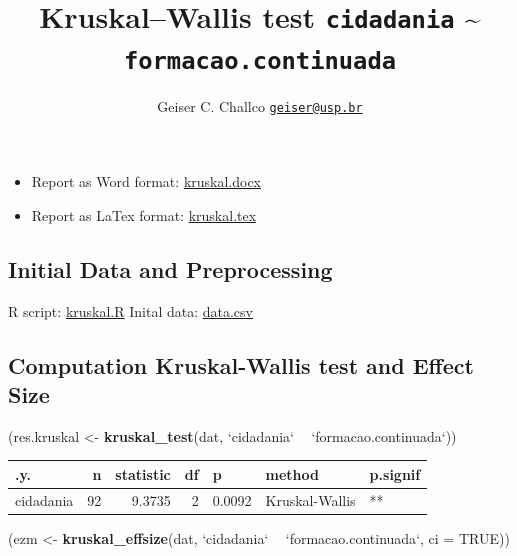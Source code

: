 \documentclass[]{article}
\title{Kruskal--Wallis test \texttt{cidadania} \textasciitilde{}
\texttt{formacao.continuada}}
\author{Geiser C. Challco \href{mailto:geiser@usp.br}{\nolinkurl{geiser@usp.br}}}
\date{}
\newenvironment{Shaded}{\begin{snugshade}}{\end{snugshade}}
\newcommand{\DataTypeTok}[1]{\textcolor[rgb]{0.13,0.29,0.53}{#1}}
\newcommand{\KeywordTok}[1]{\textcolor[rgb]{0.13,0.29,0.53}{\textbf{#1}}}
\newcommand{\NormalTok}[1]{#1}
\newcommand{\OperatorTok}[1]{\textcolor[rgb]{0.81,0.36,0.00}{\textbf{#1}}}
\newcommand{\OtherTok}[1]{\textcolor[rgb]{0.56,0.35,0.01}{#1}}
\newcommand{\StringTok}[1]{\textcolor[rgb]{0.31,0.60,0.02}{#1}}
\providecommand{\tightlist}{%
  \setlength{\itemsep}{0pt}\setlength{\parskip}{0pt}}
\begin{document}
\maketitle

\begin{itemize}
\tightlist
\item
  Report as Word format: \url{kruskal.docx}
\item
  Report as LaTex format: \url{kruskal.tex}
\end{itemize}

\hypertarget{initial-data-and-preprocessing}{%
\subsection{Initial Data and
Preprocessing}\label{initial-data-and-preprocessing}}

R script: \url{kruskal.R} Inital data: \url{data.csv}

\hypertarget{computation-kruskal-wallis-test-and-effect-size}{%
\subsection{Computation Kruskal-Wallis test and Effect
Size}\label{computation-kruskal-wallis-test-and-effect-size}}

\begin{Shaded}
\begin{Highlighting}[]
\NormalTok{(res.kruskal <-}\StringTok{ }\KeywordTok{kruskal_test}\NormalTok{(dat, }\StringTok{`}\DataTypeTok{cidadania}\StringTok{`} \OperatorTok{~}\StringTok{ `}\DataTypeTok{formacao.continuada}\StringTok{`}\NormalTok{))}
\end{Highlighting}
\end{Shaded}

\begin{longtable}[]{@{}lrrrlll@{}}
\toprule
.y. & n & statistic & df & p & method & p.signif\tabularnewline
\midrule
\endhead
cidadania & 92 & 9.3735 & 2 & 0.0092 & Kruskal-Wallis &
**\tabularnewline
\bottomrule
\end{longtable}

\begin{Shaded}
\begin{Highlighting}[]
\NormalTok{(ezm <-}\StringTok{ }\KeywordTok{kruskal_effsize}\NormalTok{(dat, }\StringTok{`}\DataTypeTok{cidadania}\StringTok{`} \OperatorTok{~}\StringTok{ `}\DataTypeTok{formacao.continuada}\StringTok{`}\NormalTok{, }\DataTypeTok{ci =} \OtherTok{TRUE}\NormalTok{))}
\end{Highlighting}
\end{Shaded}
\end{document}
